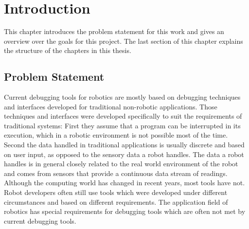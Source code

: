 \chapter{Introduction}
This chapter introduces the problem statement for this work and gives an overview over the goals for this project. The last section of this chapter explains the structure of the chapters in this thesis.

\section{Problem Statement}
\label{problem_statement}
Current debugging tools for robotics are mostly based on debugging techniques and interfaces developed for traditional non-robotic applications. Those techniques and interfaces were developed specifically to suit the requirements of traditional systems: First they assume that a program can be interrupted in its execution, which in a robotic environment is not possible most of the time. Second the data handled in traditional applications is usually discrete and based on user input, as opposed to the sensory data a robot handles. The data a robot handles is in general closely related to the real world environment of the robot and comes from sensors that provide a continuous data stream of readings. Although the computing world has changed in recent years, most tools have not. Robot developers often still use tools which were developed under different circumstances and based on different requirements. The application field of robotics has special requirements for debugging tools which are often not met by current debugging tools.

